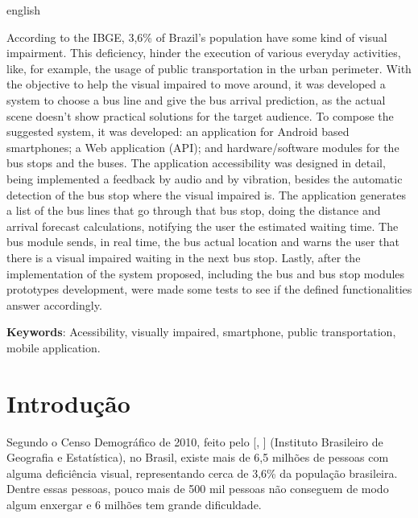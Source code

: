 \documentclass[
	12pt,				%
	oneside,			%
	a4paper,			%
	brazil				%
]{abntex2}
\newcommand{\citecustom}[1]{[\citeauthoronline{#1}, \citeyear{#1}]}
\newcommand*{\BeginNoToc}{%
  \addtocontents{toc}{%
    \edef\protect\SavedTocDepth{\protect\the\protect\value{tocdepth}}%
  }%
  \addtocontents{toc}{%
    \protect\setcounter{tocdepth}{-10}%
  }%
}
\newcommand*{\EndNoToc}{%
  \addtocontents{toc}{%
    \protect\setcounter{tocdepth}{\protect\SavedTocDepth}%
  }%
}
\begin{document}
\begin{resumo}[Abstract] 
\begin{otherlanguage*}{english}

According to the IBGE, 3,6\% of Brazil's population have some kind of visual impairment. This deficiency, hinder the execution of various everyday activities, like, for example, the usage of public transportation in the urban perimeter. With the objective to help the visual impaired to move around, it was developed a system to choose a bus line and give the bus arrival prediction, as the actual scene doesn't show practical solutions for the target audience. To compose the suggested system, it was developed: an application for Android based smartphones; a Web application (API); and hardware/software modules for the bus stops and the buses. The application accessibility was designed in detail, being implemented
a feedback by audio and by vibration, besides the automatic detection of the bus stop where the visual impaired is. The application generates a list of the bus lines that go through that bus stop, doing the distance and arrival forecast calculations, notifying the user the estimated waiting time. The bus module sends, in real time, the bus actual location and warns the user that there is a visual impaired waiting in the next bus stop. Lastly, after the implementation of the system proposed, including the bus and bus stop modules prototypes development, were made some tests to see if the defined functionalities answer accordingly.

\vspace{\onelineskip} 
\noindent \textbf{Keywords}: Acessibility, visually impaired, smartphone, public transportation, mobile application. 
\end{otherlanguage*} 
\end{resumo} 


\listoffigures\thispagestyle{empty} \newpage

\BeginNoToc
\tableofcontents*
\EndNoToc

\newpage

\textual

\chapter{Introdução}

Segundo o Censo Demográfico de 2010, feito pelo \citecustom{ibge} (Instituto Brasileiro de Geografia e Estatística), no Brasil, existe mais de 6,5 milhões de pessoas com alguma deficiência visual, representando cerca de 3,6\% da população brasileira. Dentre essas pessoas, pouco mais de 500 mil pessoas não conseguem de modo algum enxergar e 6 milhões tem grande dificuldade.
\end{document}
